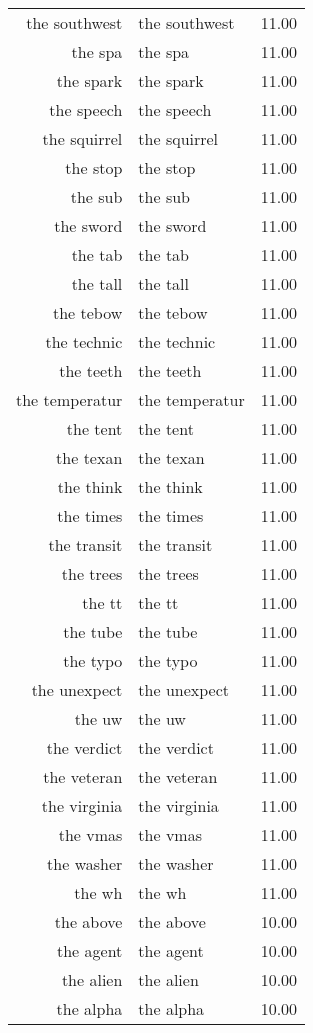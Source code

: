 \begin{table}[ht]
\begin{tabular}{rlr}
  the southwest & the southwest & 11.00 \\ 
  the spa & the spa & 11.00 \\ 
  the spark & the spark & 11.00 \\ 
  the speech & the speech & 11.00 \\ 
  the squirrel & the squirrel & 11.00 \\ 
  the stop & the stop & 11.00 \\ 
  the sub & the sub & 11.00 \\ 
  the sword & the sword & 11.00 \\ 
  the tab & the tab & 11.00 \\ 
  the tall & the tall & 11.00 \\ 
  the tebow & the tebow & 11.00 \\ 
  the technic & the technic & 11.00 \\ 
  the teeth & the teeth & 11.00 \\ 
  the temperatur & the temperatur & 11.00 \\ 
  the tent & the tent & 11.00 \\ 
  the texan & the texan & 11.00 \\ 
  the think & the think & 11.00 \\ 
  the times & the times & 11.00 \\ 
  the transit & the transit & 11.00 \\ 
  the trees & the trees & 11.00 \\ 
  the tt & the tt & 11.00 \\ 
  the tube & the tube & 11.00 \\ 
  the typo & the typo & 11.00 \\ 
  the unexpect & the unexpect & 11.00 \\ 
  the uw & the uw & 11.00 \\ 
  the verdict & the verdict & 11.00 \\ 
  the veteran & the veteran & 11.00 \\ 
  the virginia & the virginia & 11.00 \\ 
  the vmas & the vmas & 11.00 \\ 
  the washer & the washer & 11.00 \\ 
  the wh & the wh & 11.00 \\ 
  the above & the above & 10.00 \\ 
  the agent & the agent & 10.00 \\ 
  the alien & the alien & 10.00 \\ 
  the alpha & the alpha & 10.00 \\ 

\end{tabular}
\end{table}
